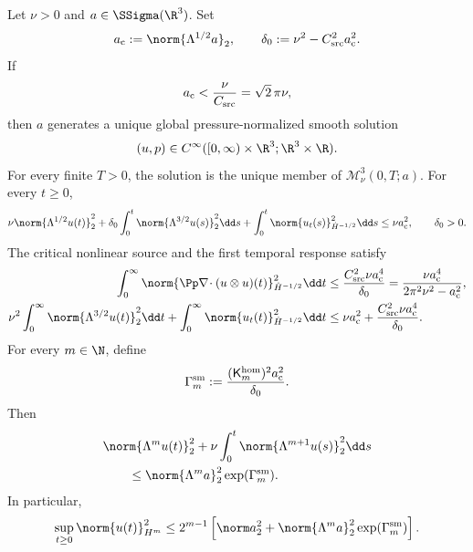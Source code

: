 \begin{theorem}
\label{u:thm:app-small-critical-global}
Let \(\nu>0\) and \(a\in\SSigma(\R^3)\).
Set
\[
 a_{\rm c}:=\norm{\Lambda^{1/2}a}_2,
 \qquad
 \delta_0:=\nu^2-C_{\rm src}^2a_{\rm c}^2.
\]
If
\begin{equation}
 a_{\rm c}<\frac{\nu}{C_{\rm src}}=\sqrt2\,\pi\nu,
 \label{u:eq:app-critical-smallness}
\end{equation}
then \(a\) generates a unique global pressure-normalized smooth solution
\[
 (u,p)\in C^\infty([0,\infty)\times\R^3;\R^3\times\R).
\]
For every finite \(T>0\), the solution is the unique member of
\(\mathscr M_\nu^3(0,T;a)\).
For every \(t\ge0\),
\begin{equation}
 \nu\norm{\Lambda^{1/2}u(t)}_2^2
 {}+\delta_0\int_0^t\norm{\Lambda^{3/2}u(s)}_2^2\dd s
+\int_0^t\norm{u_t(s)}_{\dot H^{-1/2}}^2\dd s
 \le\nu a_{\rm c}^2,
 \qquad \delta_0>0.
 \label{u:eq:app-critical-stock-action}
\end{equation}
The critical nonlinear source and the first temporal response satisfy
\begin{align}
 \int_0^\infty
 \norm{\Pp\nabla\!\cdot(u\otimes u)(t)}_{\dot H^{-1/2}}^2\dd t
 &\le \frac{C_{\rm src}^2\nu a_{\rm c}^4}{\delta_0}
 =\frac{\nu a_{\rm c}^4}{2\pi^2\nu^2-a_{\rm c}^2},
 \label{u:eq:app-small-critical-nonlinear-bound}\\
 \nu^2\int_0^\infty\norm{\Lambda^{3/2}u(t)}_2^2\dd t
 +\int_0^\infty\norm{u_t(t)}_{\dot H^{-1/2}}^2\dd t
 &\le \nu a_{\rm c}^2+\frac{C_{\rm src}^2\nu a_{\rm c}^4}{\delta_0}.
 \label{u:eq:app-small-first-temporal-response}
\end{align}
For every \(m\in\N\), define
\[
 \Gamma_m^{\rm sm}
 :=\frac{(\mathsf K_m^{\rm hom})^2a_{\rm c}^2}{\delta_0}.
\]
Then
\begin{align}
 &\norm{\Lambda^mu(t)}_2^2
 +\nu\int_0^t\norm{\Lambda^{m+1}u(s)}_2^2\dd s
 \notag\\
 &\qquad\le
 \norm{\Lambda^ma}_2^2\exp(\Gamma_m^{\rm sm}).
 \label{u:eq:app-small-data-finite-order}
\end{align}
In particular,
\begin{equation}
 \sup_{t\ge0}\norm{u(t)}_{H^m}^2
 \le
 2^{m-1}\left[
 \norm a_2^2+
 \norm{\Lambda^ma}_2^2\exp(\Gamma_m^{\rm sm})
 \right].
 \label{u:eq:app-small-data-Hm}
\end{equation}
\end{theorem}

